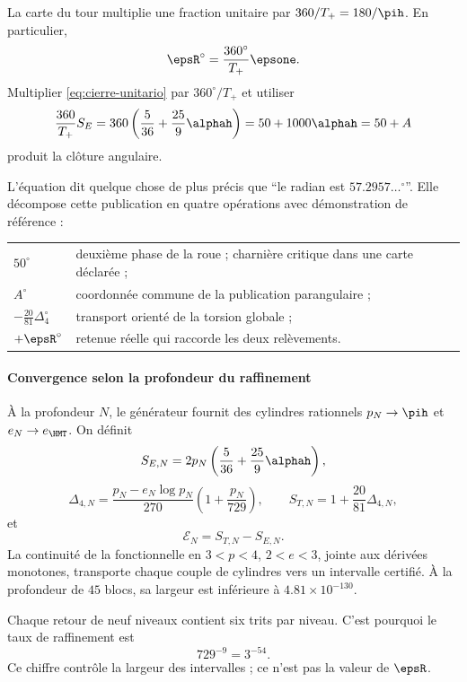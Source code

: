 La carte du tour multiplie une fraction unitaire par
\(360/T_+=180/\pih\). En particulier,
\[
\epsR^\circ=\frac{360^\circ}{T_+}\epsone.
\]
Multiplier \eqref{eq:cierre-unitario} par \(360^\circ/T_+\) et utiliser
\[
\frac{360}{T_+}S_E
=360\left(\frac5{36}+\frac{25}{9}\alphah\right)
=50+1000\alphah=50+A
\]
produit la clôture angulaire.

\begin{theorem}
\BigRadionEquation
\end{theorem}

L'équation dit quelque chose de plus précis que \enquote{le radian est
\(57.2957\ldots{}^\circ\)}. Elle décompose cette publication en quatre opérations
avec démonstration de référence :
\begin{center}
\begin{tabularx}{.96\textwidth}{>{\bfseries}l X}
\toprule
\(50^\circ\) & deuxième phase de la roue ; charnière critique dans une carte déclarée ;\\
\(A^\circ\) & coordonnée commune de la publication parangulaire ;\\
\(-\frac{20}{81}\Delta_4^\circ\) & transport orienté de la torsion globale ;\\
\(+\epsR^\circ\) & retenue réelle qui raccorde les deux relèvements.\\
\bottomrule
\end{tabularx}
\end{center}

\paragraph{Convergence selon la profondeur du raffinement}

À la profondeur \(N\), le générateur fournit des cylindres rationnels
\(p_N\to\pih\) et \(e_N\to e_{\HMT}\). On définit
\[
S_{E,N}=2p_N\left(\frac5{36}+\frac{25}{9}\alphah\right),
\]
\[
\Delta_{4,N}=\frac{p_N-e_N\log p_N}{270}
\left(1+\frac{p_N}{729}\right),\qquad
S_{T,N}=1+\frac{20}{81}\Delta_{4,N},
\]
et
\[
\mathcal E_N=S_{T,N}-S_{E,N}.
\]
La continuité de la fonctionnelle en \(3<p<4\), \(2<e<3\), jointe aux
dérivées monotones, transporte chaque couple de cylindres vers un intervalle
certifié. À la profondeur de \(45\) blocs, sa largeur est inférieure à
\(4.81\times10^{-130}\).

Chaque retour de neuf niveaux contient six trits par niveau. C'est pourquoi le taux
de raffinement est
\begin{equation}
729^{-9}=3^{-54}.
\label{eq:contraccion-54}
\end{equation}
Ce chiffre contrôle la largeur des intervalles ; ce n'est pas la valeur de
\(\epsR\).

